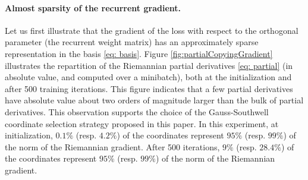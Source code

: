 \documentclass{article}
\begin{document}
\paragraph{Almost sparsity of the recurrent gradient.} Let us first illustrate that the gradient of the loss with respect to the orthogonal parameter (the recurrent weight matrix) has an approximately sparse representation in the basis \eqref{eq: basis}. Figure \ref{fig:partialCopyingGradient} illustrates the repartition of the Riemannian partial derivatives \eqref{eq: partial} (in absolute value, and computed over a minibatch), both at the initialization and after 500 training iterations. This figure indicates that a few partial derivatives have absolute value about two orders of magnitude larger than the bulk of partial derivatives. This observation supports the choice of the Gauss-Southwell coordinate selection strategy proposed in this paper. In this experiment, at initialization,  $0.1\%$ (resp. $4.2\%$) of the coordinates represent $95\%$ (resp. $99\%$) of the norm of the Riemannian gradient. After 500 iterations, $9\%$ (resp. $28.4\%$) of the coordinates represent $95\%$ (resp. $99\%$) of the norm of the Riemannian gradient.




\end{document}
